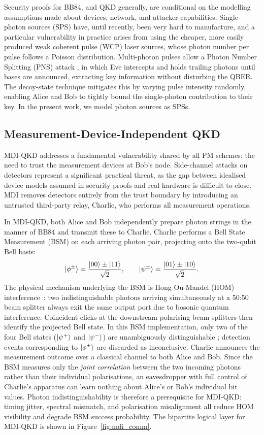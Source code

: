 \documentclass[12pt]{article}
\begin{document}
Security proofs for BB84, and QKD generally, are conditional on the modelling assumptions made about devices, network, and attacker capabilities. Single-photon sources (SPS) have, until recently, been very hard to manufacture, and a particular vulnerability in practice arises from using the cheaper, more easily produced weak coherent pulse (WCP) laser sources, whose photon number per pulse follows a Poisson distribution. Multi-photon pulses allow a Photon Number Splitting (PNS) attack \cite{Brassard_2000}, in which Eve intercepts and holds trailing photons until bases are announced, extracting key information without disturbing the QBER. The decoy-state technique \cite{Lo_decoys} mitigates this by varying pulse intensity randomly, enabling Alice and Bob to tightly bound the single-photon contribution to their key. In the present work, we model photon sources as SPSs.

\subsection{Measurement-Device-Independent QKD}

MDI-QKD addresses a fundamental vulnerability shared by all PM schemes: the need to trust the measurement devices at Bob's node. Side-channel attacks on detectors represent a significant practical threat, as the gap between idealised device models assumed in security proofs and real hardware is difficult to close. MDI removes detectors entirely from the trust boundary by introducing an untrusted third-party relay, Charlie, who performs all measurement operations.

In MDI-QKD, both Alice and Bob independently prepare photon strings in the manner of BB84 and transmit these to Charlie. Charlie performs a Bell State Measurement (BSM) on each arriving photon pair, projecting onto the two-qubit Bell basis:
\[
    \ket{\phi^\pm} = \frac{\ket{00} \pm \ket{11}}{\sqrt{2}}, \qquad \ket{\psi^\pm} = \frac{\ket{01} \pm \ket{10}}{\sqrt{2}}.
\]
The physical mechanism underlying the BSM is Hong-Ou-Mandel (HOM) interference~\cite{Hong_1987}: two indistinguishable photons arriving simultaneously at a 50:50 beam splitter always exit the same output port due to bosonic quantum interference. Coincident clicks at the downstream polarising beam splitters then identify the projected Bell state. In this BSM implementation, only two of the four Bell states ($\ket{\psi^+}$ and $\ket{\psi^-}$) are unambiguously distinguishable \cite{Lo_2012}; detection events corresponding to $\ket{\phi^\pm}$ are discarded as inconclusive. Charlie announces the measurement outcome over a classical channel to both Alice and Bob. Since the BSM measures only the \emph{joint correlation} between the two incoming photons rather than their individual polarisations, an eavesdropper with full control of Charlie's apparatus can learn nothing about Alice's or Bob's individual bit values. Photon indistinguishability is therefore a prerequisite for MDI-QKD: timing jitter, spectral mismatch, and polarisation misalignment all reduce HOM visibility and degrade BSM success probability. The bipartite logical layer for MDI-QKD is shown in Figure~\ref{fig:mdi_comm}.
\end{document}
